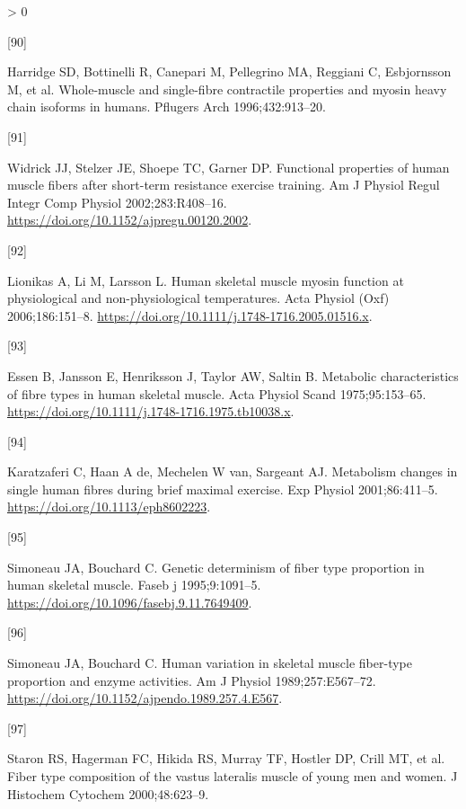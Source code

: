 \documentclass[twoside,10pt]{gihclass} %
\newlength{\cslhangindent}
\newlength{\csllabelwidth}
\newenvironment{CSLReferences}[3] %
 {%
  \setlength{\parindent}{0pt}
  \ifodd #1 \everypar{\setlength{\hangindent}{\cslhangindent}}\ignorespaces\fi
  \ifnum #2 > 0
  \setlength{\parskip}{#2\baselineskip}
  \fi
 }%
 {}
\newcommand{\CSLLeftMargin}[1]{\parbox[t]{\maxof{\widthof{#1}}{\csllabelwidth}}{#1}}
\newcommand{\CSLRightInline}[1]{\parbox[t]{\linewidth}{#1}}
\begin{document}
\begin{CSLReferences}{0}{0}
\leavevmode\hypertarget{ref-RN846}{}%
\CSLLeftMargin{{[}90{]} }
\CSLRightInline{Harridge SD, Bottinelli R, Canepari M, Pellegrino MA, Reggiani C, Esbjornsson M, et al. Whole-muscle and single-fibre contractile properties and myosin heavy chain isoforms in humans. Pflugers Arch 1996;432:913--20.}

\leavevmode\hypertarget{ref-RN2169}{}%
\CSLLeftMargin{{[}91{]} }
\CSLRightInline{Widrick JJ, Stelzer JE, Shoepe TC, Garner DP. Functional properties of human muscle fibers after short-term resistance exercise training. Am J Physiol Regul Integr Comp Physiol 2002;283:R408--16. \url{https://doi.org/10.1152/ajpregu.00120.2002}.}

\leavevmode\hypertarget{ref-RN849}{}%
\CSLLeftMargin{{[}92{]} }
\CSLRightInline{Lionikas A, Li M, Larsson L. Human skeletal muscle myosin function at physiological and non-physiological temperatures. Acta Physiol (Oxf) 2006;186:151--8. \url{https://doi.org/10.1111/j.1748-1716.2005.01516.x}.}

\leavevmode\hypertarget{ref-RN1885}{}%
\CSLLeftMargin{{[}93{]} }
\CSLRightInline{Essen B, Jansson E, Henriksson J, Taylor AW, Saltin B. Metabolic characteristics of fibre types in human skeletal muscle. Acta Physiol Scand 1975;95:153--65. \url{https://doi.org/10.1111/j.1748-1716.1975.tb10038.x}.}

\leavevmode\hypertarget{ref-RN2801}{}%
\CSLLeftMargin{{[}94{]} }
\CSLRightInline{Karatzaferi C, Haan A de, Mechelen W van, Sargeant AJ. Metabolism changes in single human fibres during brief maximal exercise. Exp Physiol 2001;86:411--5. \url{https://doi.org/10.1113/eph8602223}.}

\leavevmode\hypertarget{ref-RN2798}{}%
\CSLLeftMargin{{[}95{]} }
\CSLRightInline{Simoneau JA, Bouchard C. Genetic determinism of fiber type proportion in human skeletal muscle. Faseb j 1995;9:1091--5. \url{https://doi.org/10.1096/fasebj.9.11.7649409}.}

\leavevmode\hypertarget{ref-RN2795}{}%
\CSLLeftMargin{{[}96{]} }
\CSLRightInline{Simoneau JA, Bouchard C. Human variation in skeletal muscle fiber-type proportion and enzyme activities. Am J Physiol 1989;257:E567--72. \url{https://doi.org/10.1152/ajpendo.1989.257.4.E567}.}

\leavevmode\hypertarget{ref-RN285}{}%
\CSLLeftMargin{{[}97{]} }
\CSLRightInline{Staron RS, Hagerman FC, Hikida RS, Murray TF, Hostler DP, Crill MT, et al. Fiber type composition of the vastus lateralis muscle of young men and women. J Histochem Cytochem 2000;48:623--9.}


\end{CSLReferences}
\end{document}
